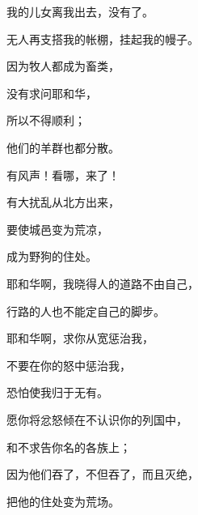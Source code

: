 {\par }{\Q 我的儿女离我出去，没有了。
\par }{\Q 无人再支搭我的帐棚，挂起我的幔子。
\par }{\Q {}因为牧人都成为畜类，
\par }{\Q 没有求问耶和华，
\par }{\Q 所以不得顺利；
\par }{\Q 他们的羊群也都分散。
\par }{\BB \par }{\Q {}有风声！看哪，{}来了！
\par }{\Q 有大扰乱从北方出来，
\par }{\Q 要使{}城邑变为荒凉，
\par }{\Q 成为野狗的住处。
\par }{\BB \par }{\Q {}耶和华啊，我晓得人的道路不由自己，
\par }{\Q 行路的人也不能定自己的脚步。
\par }{\Q {}耶和华啊，求你从宽惩治我，
\par }{\Q 不要在你的怒中惩治我，
\par }{\Q 恐怕使我归于无有。
\par }{\BB \par }{\Q {}愿你将忿怒倾在不认识你的列国中，
\par }{\Q 和不求告你名的各族上；
\par }{\Q 因为他们吞了{}，不但吞了，而且灭绝，
\par }{\Q 把他的住处变为荒场。

}
